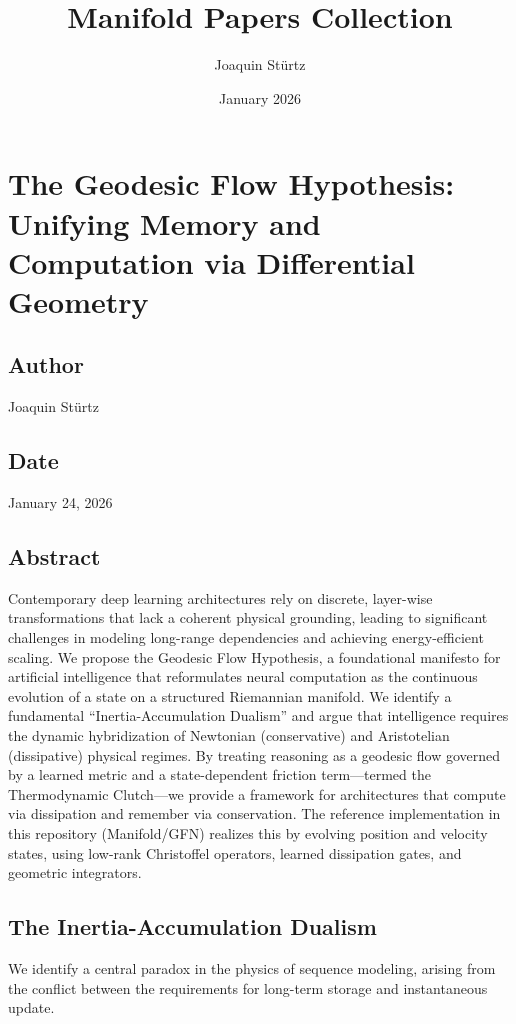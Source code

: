 \documentclass{article}
\numberwithin{equation}{section}
\begin{document}
\title{Manifold Papers Collection}
\author{Joaquin Stürtz}
\date{January 2026}
\maketitle
\tableofcontents

\section{The Geodesic Flow Hypothesis: Unifying Memory and Computation via Differential Geometry}
\subsection*{Author}
Joaquin Stürtz
\subsection*{Date}
January 24, 2026
\subsection*{Abstract}
Contemporary deep learning architectures rely on discrete, layer-wise transformations that lack a coherent physical grounding, leading to significant challenges in modeling long-range dependencies and achieving energy-efficient scaling. We propose the Geodesic Flow Hypothesis, a foundational manifesto for artificial intelligence that reformulates neural computation as the continuous evolution of a state on a structured Riemannian manifold. We identify a fundamental ``Inertia-Accumulation Dualism'' and argue that intelligence requires the dynamic hybridization of Newtonian (conservative) and Aristotelian (dissipative) physical regimes. By treating reasoning as a geodesic flow governed by a learned metric and a state-dependent friction term---termed the Thermodynamic Clutch---we provide a framework for architectures that compute via dissipation and remember via conservation. The reference implementation in this repository (Manifold/GFN) realizes this by evolving position and velocity states, using low-rank Christoffel operators, learned dissipation gates, and geometric integrators.

\subsection{The Inertia-Accumulation Dualism}
We identify a central paradox in the physics of sequence modeling, arising from the conflict between the requirements for long-term storage and instantaneous update.
\end{document}
